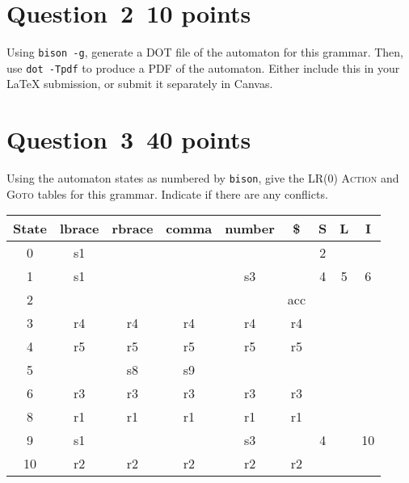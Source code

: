 \documentclass[10pt]{article}
\begin{document}
\section*{Question~2~\hfill 10 points}

Using {\tt bison -g}, generate a DOT file of the automaton
for this grammar.
Then, use {\tt dot -Tpdf} to produce a PDF of the automaton.
Either include this in your \LaTeX{} submission, or submit it separately
in Canvas.

\begin{framed}
\end{framed}
\newpage
\section*{Question~3~\hfill 40 points}

Using the automaton states as numbered by {\tt bison},
give the LR(0) \textsc{Action} and \textsc{Goto} tables
for this grammar.
Indicate if there are any conflicts.

\begin{framed}
  \centering
  \begin{tabular}{c|ccccc|ccc}
    State & lbrace & rbrace & comma  & number & \$    & S      & L      & I  \\
    \midrule
    0     & s1     &        &        &        &       & 2      &        &    \\
    1     & s1     &        &        & s3     &       & 4      & 5      & 6  \\
    2     &        &        &        &        & acc   &        &        &    \\
    3     & r4     & r4     & r4     & r4     & r4    &        &        &    \\
    4     & r5     & r5     & r5     & r5     & r5    &        &        &    \\
    5     &        & s8     & s9     &        &       &        &        &    \\
    6     & r3     & r3     & r3     & r3     & r3    &        &        &    \\
    8     & r1     & r1     & r1     & r1     & r1    &        &        &    \\
    9     & s1     &        &        & s3     &       & 4      &        & 10 \\
    10    & r2     & r2     & r2     & r2     & r2    &        &        &    \\
  \end{tabular}
\end{framed}
\end{document}
